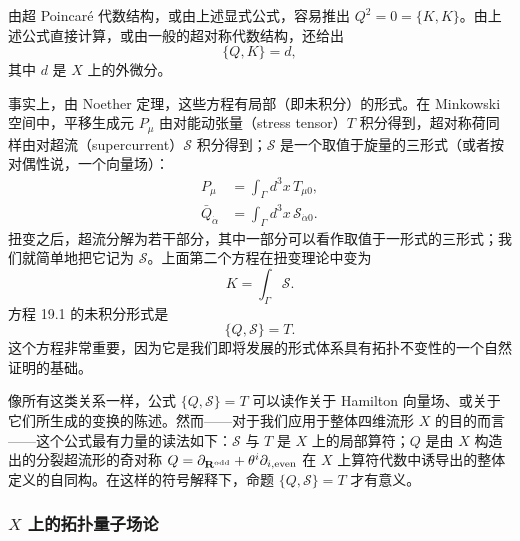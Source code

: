 由超 Poincaré 代数结构，或由上述显式公式，容易推出 $Q^2=0=\{K,K\}$。由上述公式直接计算，或由一般的超对称代数结构，还给出
\begin{equation}
\tag{19.1}
\label{eq:19-1}
\{Q,K\}=d,
\end{equation}
其中 $d$ 是 $X$ 上的外微分。

事实上，由 Noether 定理，这些方程有局部（即未积分）的形式。在 Minkowski 空间中，平移生成元 $P_\mu$ 由对能动张量（stress tensor）$T$ 积分得到，超对称荷同样由对超流（supercurrent）$\mathcal{S}$ 积分得到；$\mathcal{S}$ 是一个取值于旋量的三形式（或者按对偶性说，一个向量场）：
\[
\begin{aligned}
P_\mu&=\int_\Gamma d^3x\,T_{\mu0},\\
\bar Q_{\dot\alpha}&=\int_\Gamma d^3x\,\mathcal{S}_{\dot\alpha0}.
\end{aligned}
\]
扭变之后，超流分解为若干部分，其中一部分可以看作取值于一形式的三形式；我们就简单地把它记为 $\mathcal{S}$。上面第二个方程在扭变理论中变为
\[
K=\int_\Gamma\mathcal{S}.
\]
方程 19.1 的未积分形式是
\[
\{Q,\mathcal{S}\}=T.
\]
这个方程非常重要，因为它是我们即将发展的形式体系具有拓扑不变性的一个自然证明的基础。


像所有这类关系一样，公式 $\{Q,\mathcal{S}\}=T$ 可以读作关于 Hamilton 向量场、或关于它们所生成的变换的陈述。然而——对于我们应用于整体四维流形 $X$ 的目的而言——这个公式最有力量的读法如下：$\mathcal{S}$ 与 $T$ 是 $X$ 上的局部算符；$Q$ 是由 $X$ 构造出的分裂超流形的奇对称 $Q=\partial_{\mathbf{R}^{\rm odd}}+\theta^i\partial_{i,{\rm even}}$ 在 $X$ 上算符代数中诱导出的整体定义的自同构。在这样的符号解释下，命题 $\{Q,\mathcal{S}\}=T$ 才有意义。

\subsubsection{$X$ 上的拓扑量子场论}

